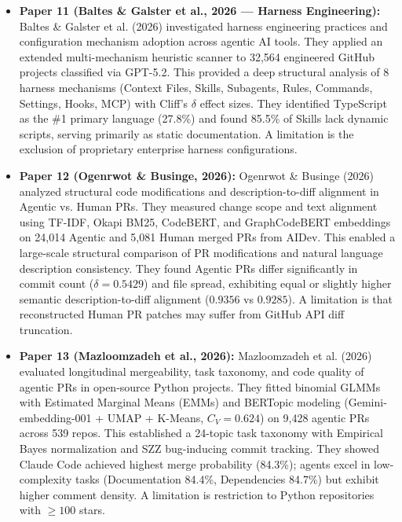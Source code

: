 \documentclass[11pt,a4paper]{article}
\begin{document}
\begin{itemize}[leftmargin=1.5em, itemsep=8pt]
    \item \textbf{Paper 11 (Baltes \& Galster et al., 2026 --- Harness Engineering):}
    Baltes \& Galster et al. (2026) investigated harness engineering practices and configuration mechanism adoption across agentic AI tools. They applied an extended multi-mechanism heuristic scanner to 32,564 engineered GitHub projects classified via GPT-5.2. This provided a deep structural analysis of 8 harness mechanisms (Context Files, Skills, Subagents, Rules, Commands, Settings, Hooks, MCP) with Cliff's $\delta$ effect sizes. They identified TypeScript as the \#1 primary language (27.8\%) and found 85.5\% of Skills lack dynamic scripts, serving primarily as static documentation. A limitation is the exclusion of proprietary enterprise harness configurations.

    \item \textbf{Paper 12 (Ogenrwot \& Businge, 2026):}
    Ogenrwot \& Businge (2026) analyzed structural code modifications and description-to-diff alignment in Agentic vs. Human PRs. They measured change scope and text alignment using TF-IDF, Okapi BM25, CodeBERT, and GraphCodeBERT embeddings on 24,014 Agentic and 5,081 Human merged PRs from AIDev. This enabled a large-scale structural comparison of PR modifications and natural language description consistency. They found Agentic PRs differ significantly in commit count ($\delta = 0.5429$) and file spread, exhibiting equal or slightly higher semantic description-to-diff alignment ($0.9356$ vs $0.9285$). A limitation is that reconstructed Human PR patches may suffer from GitHub API diff truncation.

    \item \textbf{Paper 13 (Mazloomzadeh et al., 2026):}
    Mazloomzadeh et al. (2026) evaluated longitudinal mergeability, task taxonomy, and code quality of agentic PRs in open-source Python projects. They fitted binomial GLMMs with Estimated Marginal Means (EMMs) and BERTopic modeling (Gemini-embedding-001 + UMAP + K-Means, $C_V = 0.624$) on 9,428 agentic PRs across 539 repos. This established a 24-topic task taxonomy with Empirical Bayes normalization and SZZ bug-inducing commit tracking. They showed Claude Code achieved highest merge probability (84.3\%); agents excel in low-complexity tasks (Documentation 84.4\%, Dependencies 84.7\%) but exhibit higher comment density. A limitation is restriction to Python repositories with $\ge 100$ stars.


\end{itemize}
\end{document}
